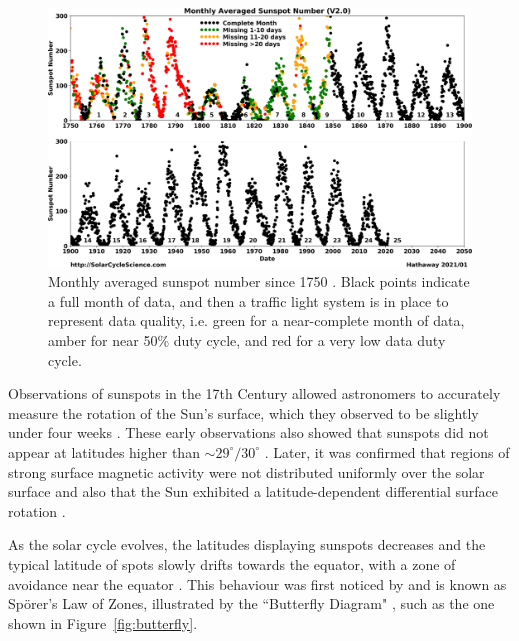 \begin{figure}[ht!]
	\centering
	\includegraphics[width=\columnwidth]{SSN_monthly_landscape.png}
	\caption{Monthly averaged sunspot number since 1750 \citep{hathaway_solar_2017}. Black points indicate a full month of data, and then a traffic light system is in place to represent data quality, i.e. green for a near-complete month of data, amber for near 50\% duty cycle, and red for a very low data duty cycle.}
	\label{fig:ssn}
\end{figure}

Observations of sunspots in the 17th Century allowed astronomers to accurately measure the rotation of the Sun's surface, which they observed to be slightly under four weeks \citep{casanovas_early_1997, casas_solar_2006, luminet_reception_2017}. These early observations also showed that sunspots did not appear at latitudes higher than $\sim29^{\circ}/30^{\circ}$ \citep{casanovas_early_1997}. Later, it was confirmed that regions of strong surface magnetic activity were not distributed uniformly over the solar surface and also that the Sun exhibited a latitude-dependent differential surface rotation \citep{lee_cyril_1858}. %

As the solar cycle evolves, the latitudes displaying sunspots decreases and the typical latitude of spots slowly drifts towards the equator, with a zone of avoidance near the equator \citep{hathaway_solar_2015}. This behaviour was first noticed by \citet{carrington_observations_1863} and is known as Sp\"{o}rer's Law of Zones, illustrated by the ``Butterfly Diagram" \citep{maunder_spoerers_1903, maunder_note_1904}, such as the one shown in Figure~\ref{fig:butterfly}.

